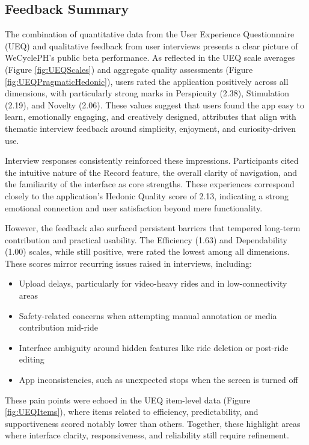 \subsection{Feedback Summary}
The combination of quantitative data from the User Experience Questionnaire (UEQ) and qualitative feedback from user interviews presents a clear picture of WeCyclePH's public beta performance. As reflected in the UEQ scale averages (Figure \ref{fig:UEQScales}) and aggregate quality assessments (Figure \ref{fig:UEQPragmaticHedonic}), users rated the application positively across all dimensions, with particularly strong marks in Perspicuity (2.38), Stimulation (2.19), and Novelty (2.06). These values suggest that users found the app easy to learn, emotionally engaging, and creatively designed, attributes that align with thematic interview feedback around simplicity, enjoyment, and curiosity-driven use.

Interview responses consistently reinforced these impressions. Participants cited the intuitive nature of the Record feature, the overall clarity of navigation, and the familiarity of the interface as core strengths. These experiences correspond closely to the application's Hedonic Quality score of 2.13, indicating a strong emotional connection and user satisfaction beyond mere functionality.

However, the feedback also surfaced persistent barriers that tempered long-term contribution and practical usability. The Efficiency (1.63) and Dependability (1.00) scales, while still positive, were rated the lowest among all dimensions. These scores mirror recurring issues raised in interviews, including:
\begin{itemize}
    \item Upload delays, particularly for video-heavy rides and in low-connectivity areas
    \item Safety-related concerns when attempting manual annotation or media contribution mid-ride
    \item Interface ambiguity around hidden features like ride deletion or post-ride editing
    \item App inconsistencies, such as unexpected stops when the screen is turned off
\end{itemize}

These pain points were echoed in the UEQ item-level data (Figure \ref{fig:UEQItems}), where items related to efficiency, predictability, and supportiveness scored notably lower than others. Together, these highlight areas where interface clarity, responsiveness, and reliability still require refinement.

